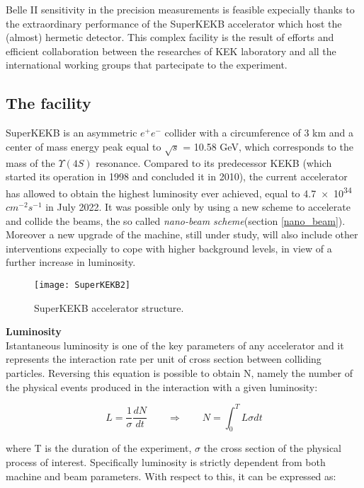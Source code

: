 Belle II sensitivity in the precision measurements is feasible expecially thanks to the extraordinary performance of the SuperKEKB accelerator which host the (almost) hermetic detector. This complex facility is the result of efforts and efficient collaboration between the researches of KEK laboratory and all the international working groups that partecipate to the experiment.


\subsection{The facility}

SuperKEKB is an asymmetric $e^{+}e^{-}$ collider with a circumference of 3 km and a center of mass energy peak equal to  $\sqrt{s}$ = 10.58 GeV, which corresponds to the mass of the $\Upsilon(4S)$ resonance.
Compared to its predecessor KEKB (which started its operation in 1998 and concluded it in 2010), the current accelerator has allowed to obtain the highest luminosity ever achieved, equal to \num{4.7e34} $cm^{-2}s^{-1}$ in July 2022. It was possible only by using a new scheme to accelerate and collide the beams, the so called \textit{nano-beam scheme}(section \vref{nano_beam}). Moreover a new upgrade of the machine, still under study, will also include other interventions expecially to cope with higher background levels, in view of a further increase in luminosity.

\begin{figure}[h!]
\centering
\texttt{[image: SuperKEKB2]}
\caption{SuperKEKB accelerator structure.}
\label{fig:superkekb}
\end{figure}


\bigskip

\textbf{Luminosity}\\

Istantaneous luminosity is one of the key parameters of any accelerator and it represents the interaction rate per unit of cross section between colliding particles. Reversing this equation is possible to obtain N, namely the number of the physical events produced in the interaction with a given luminosity:

\begin{equation}
L =\frac{1}{\sigma}\frac{dN}{dt}  \qquad   \Rightarrow \qquad  N = \int_{0}^{T} L\sigma dt
\end{equation}

where T is the duration of the experiment,  $\sigma$ the cross section of the physical process of interest.
Specifically luminosity is strictly dependent from both machine and beam parameters. With respect to this, it can be expressed as:

